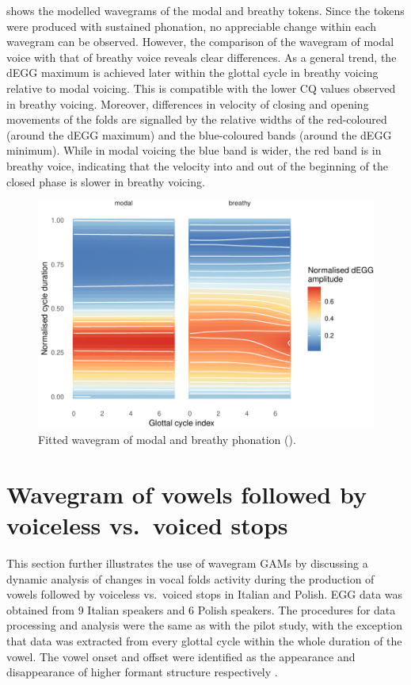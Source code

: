\documentclass[
  12pt,
  a4paper,
]{article}
\begin{document}
 shows the modelled wavegrams of the modal and breathy
tokens. Since the tokens were produced with sustained phonation, no
appreciable change within each wavegram can be observed. However, the
comparison of the wavegram of modal voice with that of breathy voice
reveals clear differences. As a general trend, the dEGG maximum is
achieved later within the glottal cycle in breathy voicing relative to
modal voicing. This is compatible with the lower CQ values observed in
breathy voicing. Moreover, differences in velocity of closing and
opening movements of the folds are signalled by the relative widths of
the red-coloured (around the dEGG maximum) and the blue-coloured bands
(around the dEGG minimum). While in modal voicing the blue band is
wider, the red band is in breathy voice, indicating that the velocity
into and out of the beginning of the closed phase is slower in breathy
voicing.

\begin{figure}
\includegraphics[width=\linewidth]{2019-wavegram_files/figure-latex/surface-p-1} \caption{Fitted wavegram of modal and breathy phonation ().}\label{f:surface-p}
\end{figure}

\hypertarget{wavegram-of-vowels-followed-by-voiceless-vs.-voiced-stops}{%
\section{Wavegram of vowels followed by voiceless vs.~voiced
stops}\label{wavegram-of-vowels-followed-by-voiceless-vs.-voiced-stops}}

\label{s:voicing}

This section further illustrates the use of wavegram GAMs by discussing
a dynamic analysis of changes in vocal folds activity during the
production of vowels followed by voiceless vs.~voiced stops in Italian
and Polish. EGG data was obtained from 9 Italian speakers and 6 Polish
speakers. The procedures for data processing and analysis were the same
as with the pilot study, with the exception that data was extracted from
every glottal cycle within the whole duration of the vowel. The vowel
onset and offset were identified as the appearance and disappearance of
higher formant structure respectively \citep{machac2009}.
\end{document}
